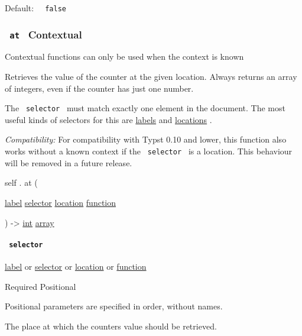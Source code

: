 Default: \texttt{\ }{\texttt{\ false\ }}\texttt{\ }

\subsubsection{\texorpdfstring{\texttt{\ at\ } {{ Contextual
}}}{ at   Contextual }}\label{definitions-at}

\label{definitions-at-contextual-tooltip}
Contextual functions can only be used when the context is known

Retrieves the value of the counter at the given location. Always returns
an array of integers, even if the counter has just one number.

The \texttt{\ selector\ } must match exactly one element in the
document. The most useful kinds of selectors for this are
\href{/docs/reference/foundations/label/}{labels} and
\href{/docs/reference/introspection/location/}{locations} .

\emph{Compatibility:} For compatibility with Typst 0.10 and lower, this
function also works without a known context if the \texttt{\ selector\ }
is a location. This behaviour will be removed in a future release.

self { . } { at } (

{ \href{/docs/reference/foundations/label/}{label}
\href{/docs/reference/foundations/selector/}{selector}
\href{/docs/reference/introspection/location/}{location}
\href{/docs/reference/foundations/function/}{function} }

) -\textgreater{} \href{/docs/reference/foundations/int/}{int}
\href{/docs/reference/foundations/array/}{array}

\paragraph{\texorpdfstring{\texttt{\ selector\ }}{ selector }}\label{definitions-at-selector}

\href{/docs/reference/foundations/label/}{label} {or}
\href{/docs/reference/foundations/selector/}{selector} {or}
\href{/docs/reference/introspection/location/}{location} {or}
\href{/docs/reference/foundations/function/}{function}

{Required} {{ Positional }}

\label{definitions-at-selector-positional-tooltip}
Positional parameters are specified in order, without names.

The place at which the counter\textquotesingle s value should be
retrieved.

